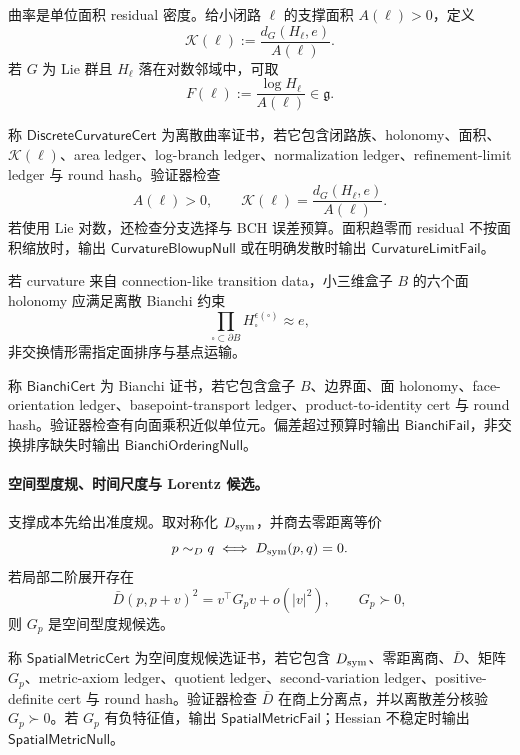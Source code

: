 曲率是单位面积 residual 密度。给小闭路 \(\ell\) 的支撑面积 \(A(\ell)>0\)，定义
\[
\boxed{
\mathcal K(\ell):=
\frac{d_G(H_\ell,e)}{A(\ell)}.
}
\]
若 \(G\) 为 Lie 群且 \(H_\ell\) 落在对数邻域中，可取
\[
F(\ell):=\frac{\log H_\ell}{A(\ell)}\in\mathfrak g.
\]

\begin{definition}[离散曲率证书]\label{def:typed-address-biaxial-completion-discrete-curvature-cert}
称 \(\mathsf{DiscreteCurvatureCert}\) 为离散曲率证书，若它包含闭路族、holonomy、面积、\(\mathcal K(\ell)\)、area ledger、log-branch ledger、normalization ledger、refinement-limit ledger 与 round hash。验证器检查
\[
A(\ell)>0,
\qquad
\mathcal K(\ell)=\frac{d_G(H_\ell,e)}{A(\ell)}.
\]
若使用 Lie 对数，还检查分支选择与 BCH 误差预算。面积趋零而 residual 不按面积缩放时，输出 \(\mathsf{CurvatureBlowupNull}\) 或在明确发散时输出 \(\mathsf{CurvatureLimitFail}\)。
\end{definition}

若 curvature 来自 connection-like transition data，小三维盒子 \(B\) 的六个面 holonomy 应满足离散 Bianchi 约束
\[
\boxed{
\prod_{\square\subset\partial B}
H_{\square}^{\epsilon(\square)}
\approx e,
}
\]
非交换情形需指定面排序与基点运输。

\begin{definition}[Bianchi 证书]\label{def:typed-address-biaxial-completion-bianchi-cert}
称 \(\mathsf{BianchiCert}\) 为 Bianchi 证书，若它包含盒子 \(B\)、边界面、面 holonomy、face-orientation ledger、basepoint-transport ledger、product-to-identity cert 与 round hash。验证器检查有向面乘积近似单位元。偏差超过预算时输出 \(\mathsf{BianchiFail}\)，非交换排序缺失时输出 \(\mathsf{BianchiOrderingNull}\)。
\end{definition}

\paragraph{空间型度规、时间尺度与 Lorentz 候选。}
支撑成本先给出准度规。取对称化 \(D_{\rm sym}\)，并商去零距离等价
\[
p\sim_Dq
\iff
D_{\rm sym}(p,q)=0.
\]
若局部二阶展开存在
\[
\bar D(p,p+v)^2=v^\top G_pv+o(|v|^2),
\qquad
G_p\succ0,
\]
则 \(G_p\) 是空间型度规候选。

\begin{definition}[空间度规候选证书]\label{def:typed-address-biaxial-completion-spatial-metric-cert}
称 \(\mathsf{SpatialMetricCert}\) 为空间度规候选证书，若它包含 \(D_{\rm sym}\)、零距离商、\(\bar D\)、矩阵 \(G_p\)、metric-axiom ledger、quotient ledger、second-variation ledger、positive-definite cert 与 round hash。验证器检查 \(\bar D\) 在商上分离点，并以离散差分核验 \(G_p\succ0\)。若 \(G_p\) 有负特征值，输出 \(\mathsf{SpatialMetricFail}\)；Hessian 不稳定时输出 \(\mathsf{SpatialMetricNull}\)。
\end{definition}

